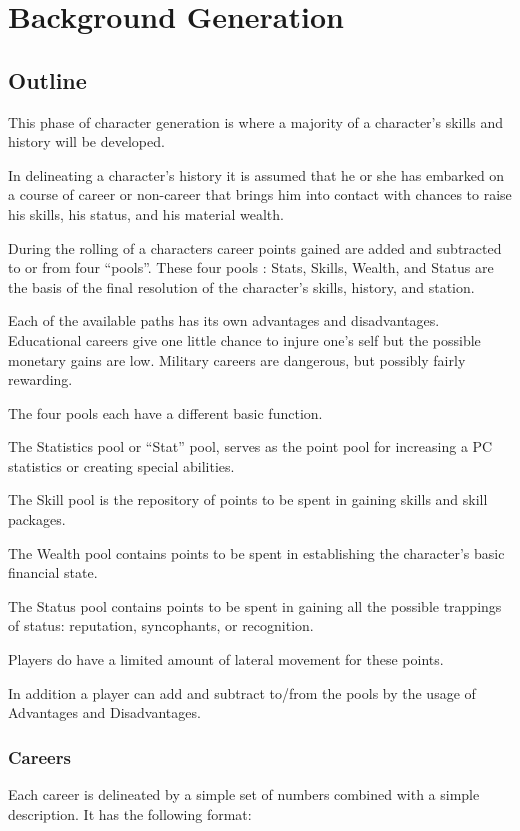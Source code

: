 \chapter{Background Generation}

\section{Outline}

This phase of character generation is where a majority of a character's
skills and history will be developed. 

In delineating a character's history it is assumed that he or she has
embarked on a course of career or non-career that brings him into
contact with chances to raise his skills, his status, and his material
wealth.

During the rolling of a characters career points gained are added 
and subtracted to or from four ``pools''. These four pools : Stats, 
Skills, Wealth, and Status are the basis of the final resolution of 
the character's skills, history, and station.

Each of the available paths has its own advantages and disadvantages.
Educational careers give one little chance to injure one's self but the
possible monetary gains are low.  Military careers are dangerous, but
possibly fairly rewarding.

The four pools each have a different basic function.

The Statistics pool or ``Stat'' pool, serves as the point pool for 
increasing a PC statistics or creating special abilities.

The Skill pool is the repository of points to be spent in gaining 
skills and skill packages.

The Wealth pool contains points to be spent in establishing the
character's basic financial state.

The Status pool contains points to be spent in gaining all the 
possible trappings of status: reputation, syncophants, or recognition.

Players do have a limited amount of lateral movement for these  points.

In addition a player can add and subtract to/from the pools by the 
usage of Advantages and Disadvantages.

\subsection{Careers}
Each career is delineated by a simple set of numbers combined with a
simple description. It has the following format:

